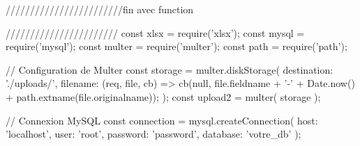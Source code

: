 ////////////////////////fin avec function





































///////////////////////
const xlsx = require('xlsx');
const mysql = require('mysql');
const multer = require('multer');
const path = require('path');

// Configuration de Multer
const storage = multer.diskStorage({
    destination: './uploads/',
    filename: (req, file, cb) => {
        cb(null, file.fieldname + '-' + Date.now() + path.extname(file.originalname));
    }
});
const upload2 = multer({ storage });

// Connexion MySQL
const connection = mysql.createConnection({
    host: 'localhost',
    user: 'root',
    password: 'password',
    database: 'votre_db'
});

